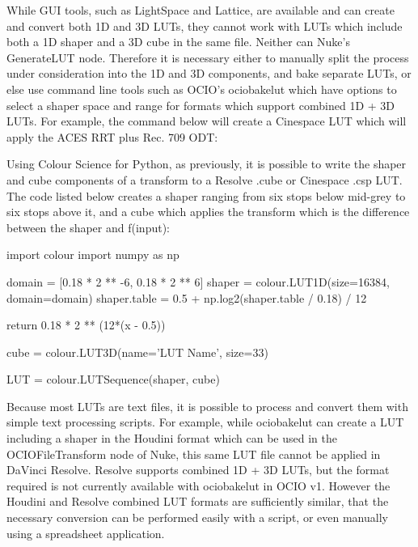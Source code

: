 While GUI tools, such as LightSpace and Lattice, are available and can create and convert both 1D and 3D LUTs, they cannot work with LUTs which include both a 1D shaper and a 3D cube in the same file. Neither can Nuke’s GenerateLUT node. Therefore it is necessary either to manually split the process under consideration into the 1D and 3D components, and bake separate LUTs, or else use command line tools such as OCIO’s ociobakelut which have options to select a shaper space and range for formats which support combined 1D + 3D LUTs. For example, the command below will create a Cinespace LUT which will apply the ACES RRT plus Rec. 709 ODT:


Using Colour Science for Python, as previously, it is possible to write the shaper and cube components of a transform to a Resolve .cube or Cinespace .csp LUT. The code listed below creates a shaper ranging from six stops below mid-grey to six stops above it, and a cube which applies the transform which is the difference between the shaper and f(input):

import colour
import numpy as np

domain = [0.18 * 2 ** -6, 0.18 * 2 ** 6]
shaper = colour.LUT1D(size=16384, domain=domain)
shaper.table = 0.5 + np.log2(shaper.table / 0.18) / 12

    return 0.18 * 2 ** (12*(x - 0.5))

cube = colour.LUT3D(name='LUT Name', size=33)


LUT = colour.LUTSequence(shaper, cube)

Because most LUTs are text files, it is possible to process and convert them with simple text processing scripts. For example, while ociobakelut can create a LUT including a shaper in the Houdini format which can be used in the OCIOFileTransform node of Nuke, this same LUT file cannot be applied in DaVinci Resolve. Resolve supports combined 1D + 3D LUTs, but the format required is not currently available with ociobakelut in OCIO v1. However the Houdini and Resolve combined LUT formats are sufficiently similar, that the necessary conversion can be performed easily with a script, or even manually using a spreadsheet application.

